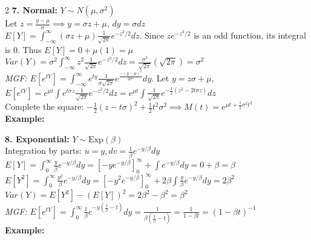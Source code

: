 \documentclass[10pt]{article}
\begin{document}
\begin{multicols*}{2}
\textbf{7. Normal:} $Y \sim N(\mu, \sigma^2)$\\
Let $z = \frac{y-\mu}{\sigma} \implies y = \sigma z + \mu, \, dy = \sigma dz$\\
$E[Y] = \int_{-\infty}^{\infty} (\sigma z + \mu) \frac{1}{\sqrt{2\pi}} e^{-z^2/2} dz$. Since $z e^{-z^2/2}$ is an odd function, its integral is 0. Thus $E[Y] = 0 + \mu(1) = \mu$\\
$Var(Y) = \sigma^2 \int_{-\infty}^{\infty} z^2 \frac{1}{\sqrt{2\pi}} e^{-z^2/2} dz = \frac{\sigma^2}{\sqrt{2\pi}} (\sqrt{2\pi}) = \sigma^2$\\
\textit{MGF:} $E[e^{tY}] = \int_{-\infty}^{\infty} e^{ty} \frac{1}{\sigma\sqrt{2\pi}} e^{\frac{-(y-\mu)^2}{2\sigma^2}} dy$. Let $y=z\sigma+\mu$, \\
$E[e^{tY}] = e^{\mu t} \int e^{t\sigma z} \frac{1}{\sqrt{2\pi}} e^{-z^2/2} dz = e^{\mu t} \int \frac{1}{\sqrt{2\pi}} e^{-\frac{1}{2}(z^2 - 2t\sigma z)} dz$\\
Complete the square: $-\frac{1}{2}(z-t\sigma)^2 + \frac{1}{2}t^2\sigma^2 \implies M(t) = e^{\mu t + \frac{1}{2}\sigma^2 t^2}$\\
\textbf{Example:} 
\vspace{1.2cm}

\textbf{8. Exponential:} $Y \sim \text{Exp}(\beta)$\\
Integration by parts: $u=y, dv=\frac{1}{\beta}e^{-y/\beta}dy$\\
$E[Y] = \int_{0}^{\infty} \frac{y}{\beta} e^{-y/\beta} dy = [-y e^{-y/\beta}]_{0}^{\infty} + \int e^{-y/\beta} dy = 0 + \beta = \beta$\\
$E[Y^2] = \int_{0}^{\infty} \frac{y^2}{\beta} e^{-y/\beta} dy = [-y^2 e^{-y/\beta}]_{0}^{\infty} + 2\beta \int \frac{y}{\beta} e^{-y/\beta} dy = 2\beta^2$\\
$Var(Y) = E[Y^2] - (E[Y])^2 = 2\beta^2 - \beta^2 = \beta^2$\\
\textit{MGF:} $E[e^{tY}] = \int_{0}^{\infty} \frac{1}{\beta} e^{-y(\frac{1}{\beta}-t)} dy = \frac{1}{\beta(\frac{1}{\beta}-t)} = \frac{1}{1-\beta t} = (1-\beta t)^{-1}$\\
\textbf{Example:} 
\vspace{1.2cm}


\end{multicols*}
\end{document}
